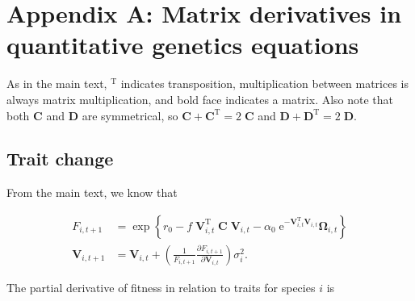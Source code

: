 \section*{Appendix A: Matrix derivatives in quantitative genetics equations}

\renewcommand{\thefigure}{A\arabic{figure}}
\renewcommand{\theequation}{A\arabic{equation}}
\renewcommand{\thetable}{A\arabic{table}}
\setcounter{equation}{0}
\setcounter{figure}{0}
\setcounter{table}{0}


As in the main text, $^{\textrm{T}}$ indicates transposition,
multiplication between matrices is always matrix multiplication, and
bold face indicates a matrix.
Also note that both $\mathbf{C}$ and $\mathbf{D}$ are symmetrical,
so $\mathbf{C} + \mathbf{C}^{\textrm{T}} = 2 \; \mathbf{C}$ and
$\mathbf{D} + \mathbf{D}^{\textrm{T}} = 2 \; \mathbf{D}$.


\subsection*{Trait change}

From the main text, we know that

\begin{equation*}
\begin{split}
    F_{i,t+1} &= \exp \left\{
        r_0 - f \; \mathbf{V}_{i,t}^{\textrm{T}} \; \mathbf{C} \; \mathbf{V}_{i,t} -
        \alpha_0 \;\textrm{e}^{- \mathbf{V}_{i,t}^{\textrm{T}} \mathbf{V}_{i,t} } \mathbf{\Omega}_{i,t}
        \right\} \\
    \mathbf{V}_{i,t+1} &= \mathbf{V}_{i,t} + \left( \frac{1}{F_{i,t+1}}
        \frac{\partial F_{i,t+1}}{\partial \mathbf{V}_{i,t}} \right) \sigma^2_i
    \textrm{.}
\end{split}
\end{equation*}


The partial derivative of fitness in relation to traits for species $i$ is


